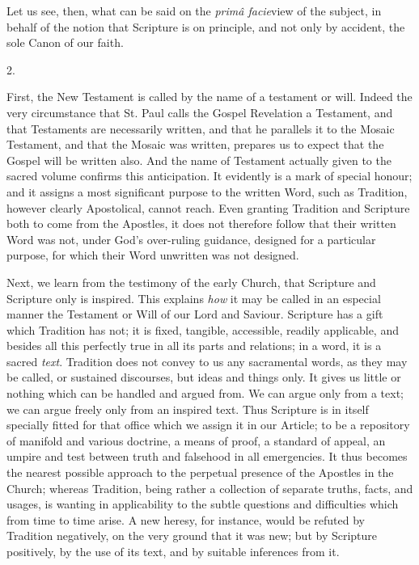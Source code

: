 Let us see, then, what can be said on the \emph{primâ facie}view
of the subject, in behalf of the notion that Scripture is on
principle, and not only by accident, the sole Canon of our faith.

2.

First, the New Testament is called by the name of a testament or
will. Indeed the very circumstance that St. Paul calls the
Gospel Revelation a Testament, and that Testaments are necessarily
written, and that he parallels it to the Mosaic Testament, and that
the Mosaic was written, prepares us to expect that the Gospel will be
written also. And the name of Testament actually given to the sacred
volume confirms this anticipation. It evidently is a mark of special
honour; and it assigns a most significant purpose to the written Word,
such as Tradition, however clearly Apostolical, cannot reach. Even
granting Tradition and Scripture both to come from the Apostles, it
does not therefore follow that their written Word was not, under God's
over-ruling guidance, designed for a particular purpose, for which
their Word unwritten was not designed.

Next, we learn from the testimony of the early Church, that
Scripture and Scripture only is inspired. This explains \emph{how} it
may be called in an especial manner the Testament or Will of our Lord
and Saviour. Scripture has a gift which Tradition has not; it is
fixed, tangible, accessible, readily applicable, and besides all this
perfectly true in all its parts and relations; in a word, it is a
sacred \emph{text}. Tradition does not convey to us any sacramental
words, as they may be called, or sustained discourses, but ideas and
things only. It gives us little or nothing which can be handled and
argued from. We can argue only from a text; we can argue freely only
from an inspired text. Thus Scripture is in itself specially fitted
for that office which we assign it in our Article; to be a repository
of manifold and various doctrine, a means of proof, a standard of
appeal, an umpire and test between truth and falsehood in all
emergencies. It thus becomes the nearest possible approach to the
perpetual presence of the Apostles in the Church; whereas Tradition,
being rather a collection of separate truths, facts, and usages, is
wanting in applicability to the subtle questions and difficulties
which from time to time arise. A new heresy, for instance, would
be refuted by Tradition negatively, on the very ground that it was
new; but by Scripture positively, by the use of its text, and by
suitable inferences from it.

